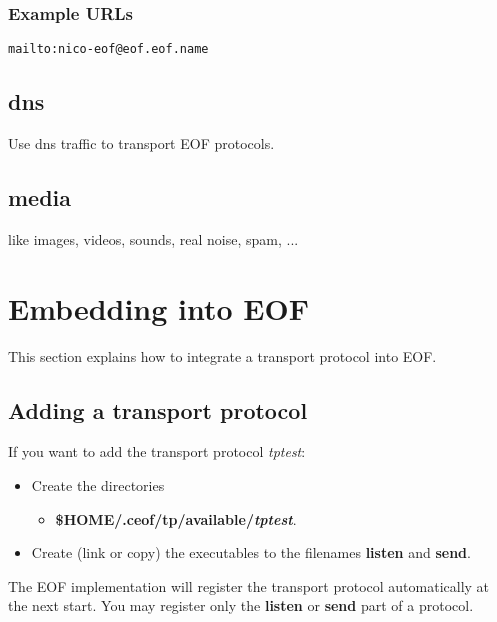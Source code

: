 \documentclass[12pt,a4paper]{book}
\begin{document}
\subsubsection{Example URLs}
\begin{verbatim}
mailto:nico-eof@eof.eof.name
\end{verbatim}
\subsection{dns}
Use dns traffic to transport EOF protocols.
\subsection{media}
like images, videos, sounds, real noise, spam, ...
\section{Embedding into EOF}
This section explains how to integrate a transport protocol into EOF.
\subsection{Adding a transport protocol}
If you want to add the transport protocol \emph{tptest}:
\begin{itemize}
\item Create the directories
\begin{itemize}
\item \textbf{\$HOME/.ceof/tp/available/\emph{tptest}}.
\end{itemize}
\item Create (link or copy) the executables to the filenames \textbf{listen}
and \textbf{send}.
\end{itemize}
The EOF implementation will register the transport protocol automatically
at the next start. You may register only the \textbf{listen} or
\textbf{send} part of a protocol.
\end{document}
